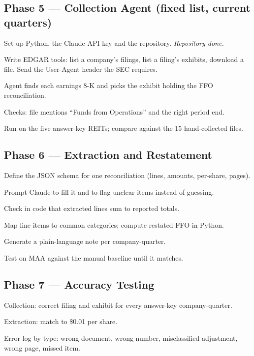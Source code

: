 \documentclass[11pt]{article}
\begin{document}
\subsection{Phase 5 --- Collection Agent (fixed list, current quarters)}
\begin{todo}
  \item Set up Python, the Claude API key and the repository. \textit{Repository done.}
  \item Write EDGAR tools: list a company's filings, list a filing's exhibits, download a file.
        Send the User-Agent header the SEC requires.
  \item Agent finds each earnings 8-K and picks the exhibit holding the FFO reconciliation.
  \item Checks: file mentions ``Funds from Operations'' and the right period end.
  \item Run on the five answer-key REITs; compare against the 15 hand-collected files.
\end{todo}

\subsection{Phase 6 --- Extraction and Restatement}
\begin{todo}
  \item Define the JSON schema for one reconciliation (lines, amounts, per-share, pages).
  \item Prompt Claude to fill it and to flag unclear items instead of guessing.
  \item Check in code that extracted lines sum to reported totals.
  \item Map line items to common categories; compute restated FFO in Python.
  \item Generate a plain-language note per company-quarter.
  \item Test on MAA against the manual baseline until it matches.
\end{todo}

\subsection{Phase 7 --- Accuracy Testing}
\begin{todo}
  \item Collection: correct filing and exhibit for every answer-key company-quarter.
  \item Extraction: match to \$0.01 per share.
  \item Error log by type: wrong document, wrong number, misclassified adjustment,
        wrong page, missed item.
\end{todo}
\end{document}
